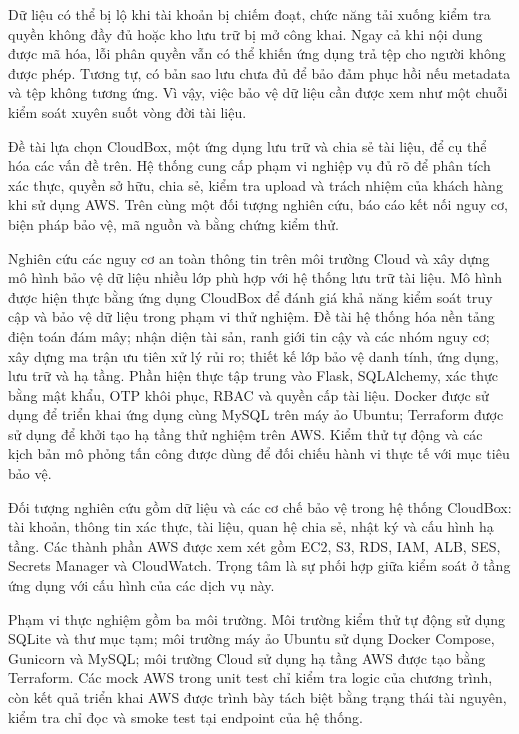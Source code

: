 Dữ liệu có thể bị lộ khi tài khoản bị chiếm đoạt, chức năng tải xuống kiểm tra quyền không đầy đủ hoặc kho lưu trữ bị mở công khai. Ngay cả khi nội dung được mã hóa, lỗi phân quyền vẫn có thể khiến ứng dụng trả tệp cho người không được phép. Tương tự, có bản sao lưu chưa đủ để bảo đảm phục hồi nếu metadata và tệp không tương ứng. Vì vậy, việc bảo vệ dữ liệu cần được xem như một chuỗi kiểm soát xuyên suốt vòng đời tài liệu.

Đề tài lựa chọn CloudBox, một ứng dụng lưu trữ và chia sẻ tài liệu, để cụ thể hóa các vấn đề trên. Hệ thống cung cấp phạm vi nghiệp vụ đủ rõ để phân tích xác thực, quyền sở hữu, chia sẻ, kiểm tra upload và trách nhiệm của khách hàng khi sử dụng AWS. Trên cùng một đối tượng nghiên cứu, báo cáo kết nối nguy cơ, biện pháp bảo vệ, mã nguồn và bằng chứng kiểm thử.

Nghiên cứu các nguy cơ an toàn thông tin trên môi trường Cloud và xây dựng mô hình bảo vệ dữ liệu nhiều lớp phù hợp với hệ thống lưu trữ tài liệu. Mô hình được hiện thực bằng ứng dụng CloudBox để đánh giá khả năng kiểm soát truy cập và bảo vệ dữ liệu trong phạm vi thử nghiệm.
Đề tài hệ thống hóa nền tảng điện toán đám mây; nhận diện tài sản, ranh giới tin cậy và các nhóm nguy cơ; xây dựng ma trận ưu tiên xử lý rủi ro; thiết kế lớp bảo vệ danh tính, ứng dụng, lưu trữ và hạ tầng. Phần hiện thực tập trung vào Flask, SQLAlchemy, xác thực bằng mật khẩu, OTP khôi phục, RBAC và quyền cấp tài liệu. Docker được sử dụng để triển khai ứng dụng cùng MySQL trên máy ảo Ubuntu; Terraform được sử dụng để khởi tạo hạ tầng thử nghiệm trên AWS. Kiểm thử tự động và các kịch bản mô phỏng tấn công được dùng để đối chiếu hành vi thực tế với mục tiêu bảo vệ.

Đối tượng nghiên cứu gồm dữ liệu và các cơ chế bảo vệ trong hệ thống CloudBox: tài khoản, thông tin xác thực, tài liệu, quan hệ chia sẻ, nhật ký và cấu hình hạ tầng. Các thành phần AWS được xem xét gồm EC2, S3, RDS, IAM, ALB, SES, Secrets Manager và CloudWatch. Trọng tâm là sự phối hợp giữa kiểm soát ở tầng ứng dụng với cấu hình của các dịch vụ này.

Phạm vi thực nghiệm gồm ba môi trường. Môi trường kiểm thử tự động sử dụng SQLite và thư mục tạm; môi trường máy ảo Ubuntu sử dụng Docker Compose, Gunicorn và MySQL; môi trường Cloud sử dụng hạ tầng AWS được tạo bằng Terraform. Các mock AWS trong unit test chỉ kiểm tra logic của chương trình, còn kết quả triển khai AWS được trình bày tách biệt bằng trạng thái tài nguyên, kiểm tra chỉ đọc và smoke test tại endpoint của hệ thống.


